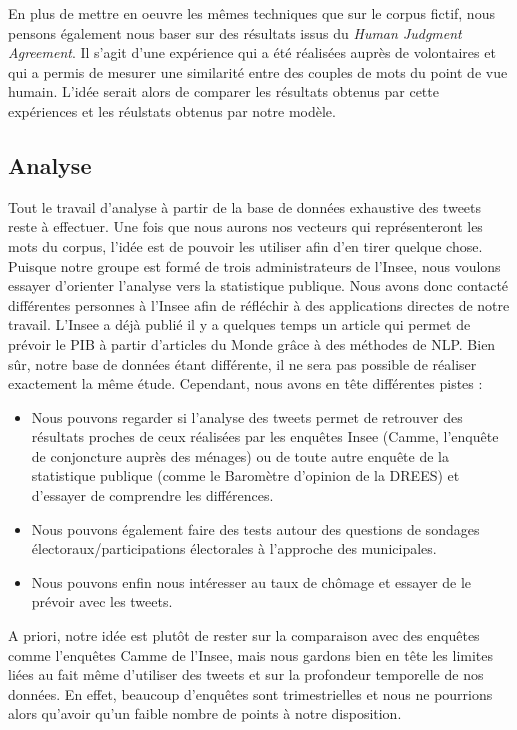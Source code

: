 \documentclass[11pt,french,french]{article}
\begin{document}
En plus de mettre en oeuvre les mêmes techniques que sur le corpus
fictif, nous pensons également nous baser sur des résultats issus du
\emph{Human Judgment Agreement}. Il s'agit d'une expérience qui a été
réalisées auprès de volontaires et qui a permis de mesurer une
similarité entre des couples de mots du point de vue humain. L'idée
serait alors de comparer les résultats obtenus par cette expériences et
les réulstats obtenus par notre modèle.

\subsection{Analyse}\label{analyse}

Tout le travail d'analyse à partir de la base de données exhaustive des
tweets reste à effectuer. Une fois que nous aurons nos vecteurs qui
représenteront les mots du corpus, l'idée est de pouvoir les utiliser
afin d'en tirer quelque chose. Puisque notre groupe est formé de trois
administrateurs de l'Insee, nous voulons essayer d'orienter l'analyse
vers la statistique publique. Nous avons donc contacté différentes
personnes à l'Insee afin de réfléchir à des applications directes de
notre travail. L'Insee a déjà publié il y a quelques temps un article
qui permet de prévoir le PIB à partir d'articles du Monde grâce à des
méthodes de NLP. Bien sûr, notre base de données étant différente, il ne
sera pas possible de réaliser exactement la même étude. Cependant, nous
avons en tête différentes pistes :

\begin{itemize}
\item Nous pouvons regarder si l’analyse des tweets permet de retrouver des résultats proches de ceux réalisées par les enquêtes Insee (Camme, l’enquête de conjoncture auprès des ménages) ou de toute autre enquête de la statistique publique (comme le Baromètre d’opinion de la DREES) et d’essayer de comprendre les différences. 
\item Nous pouvons également faire des tests autour des questions de sondages électoraux/participations électorales à l’approche des municipales.
\item Nous pouvons enfin nous intéresser au taux de chômage et essayer de le prévoir avec les tweets.
\end{itemize}

A priori, notre idée est plutôt de rester sur la comparaison avec des
enquêtes comme l'enquêtes Camme de l'Insee, mais nous gardons bien en
tête les limites liées au fait même d'utiliser des tweets et sur la
profondeur temporelle de nos données. En effet, beaucoup d'enquêtes sont
trimestrielles et nous ne pourrions alors qu'avoir qu'un faible nombre
de points à notre disposition.
\end{document}
